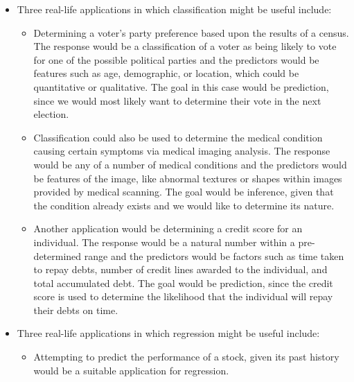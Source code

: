 \begin{itemize}
    \item[(a)] Three real-life applications in which classification
        might be useful
        include:
        \begin{itemize}
            \item[(i)] Determining a voter's party preference based upon
                the results of
                a census. The response would be a classification of a voter
                as being likely
                to vote for one of the possible political parties and the
                predictors would be
                features such as age, demographic, or location, which could
                be quantitative
                or qualitative. The goal in this case would be prediction,
                since we would
                most likely want to determine their vote in the next election.
            \item[(ii)] Classification could also be used to determine the medical
                condition causing certain symptoms via medical imaging analysis. The
                response would be any of a number of medical conditions and
                the predictors
                would be features of the image, like abnormal textures or shapes within
                images provided by medical scanning. The goal would be
                inference, given that
                the condition already exists and we would like to determine its nature.
            \item[(iii)] Another application would be determining a credit score for
                an individual. The response would be a natural number within
                a pre-determined
                range and the predictors would be factors such as time taken
                to repay debts,
                number of credit lines awarded to the individual, and total
                accumulated debt.
                The goal would be prediction, since the credit score is used
                to determine
                the likelihood that the individual will repay their debts on time.
        \end{itemize}
    \item[(b)] Three real-life applications in which regression might be useful
        include:
        \begin{itemize}
            \item[(i)] Attempting to predict the performance of a stock, given its
                past history would be a suitable application for regression.

\end{itemize}
\end{itemize}
